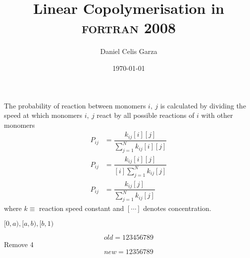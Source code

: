 \documentclass[12pt,a4paper]{article}
\title{Linear Copolymerisation in \textsc{fortran 2008}}
\author{Daniel Celis Garza}
\date{\today}
\begin{document}
	\maketitle
	The probability of reaction between monomers $i,~j$ is calculated by dividing the speed at which monomers $i,~j$ react by all possible reactions of $i$ with other monomers
	\begin{align}
		P_{ij} &= \dfrac{k_{ij} [i][j]}{\sum\limits_{j=1}^{N} k_{ij} [i][j]} \nonumber\\
		P_{ij} &= \dfrac{k_{ij} [i][j]}{[i]\sum\limits_{j=1}^{N} k_{ij} [j]} \nonumber\\
		P_{ij} &= \dfrac{k_{ij} [j]}{\sum\limits_{j=1}^{N} k_{ij} [j]} 
	\end{align}
	where $k \equiv$ reaction speed constant and $[\cdots]$ denotes concentration.
	
	$[0,a), [a,b), [b,1)$
	
	\[ old = 1 2 3 4 5 6 7 8 9 \]
	Remove 4
	\[ new = 1 2 3 5 6 7 8 9 \]
	
\end{document}
